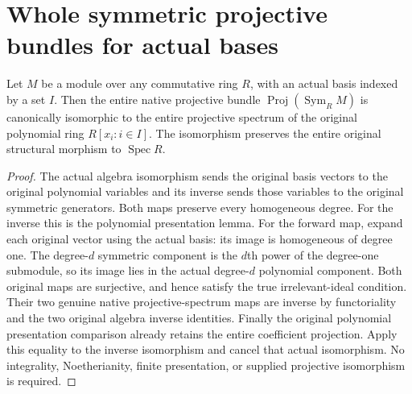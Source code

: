 \section{Whole symmetric projective bundles for actual bases}
\label{sec:symmetric-polynomial-basis-comparison}

\begin{theorem}
\label{thm:symmetric-polynomial-basis-comparison}
\leanok
{}
Let $M$ be a module over any commutative ring $R$, with an actual
basis indexed by a set $I$. Then the entire native projective bundle
$\operatorname{Proj}(\operatorname{Sym}_R M)$ is canonically isomorphic
to the entire projective spectrum of the original polynomial ring
$R[x_i:i\in I]$. The isomorphism preserves the entire original
structural morphism to $\operatorname{Spec}R$.
\end{theorem}

\begin{proof}
The actual algebra isomorphism sends the original basis vectors to
the original polynomial variables and its inverse sends those variables
to the original symmetric generators. Both maps preserve every
homogeneous degree. For the inverse this is the polynomial presentation
lemma. For the forward map, expand each original vector using the actual
basis: its image is homogeneous of degree one. The degree-$d$ symmetric
component is the $d$th power of the degree-one submodule, so its image
lies in the actual degree-$d$ polynomial component. Both original maps
are surjective, and hence satisfy the true irrelevant-ideal condition.
Their two genuine native projective-spectrum maps are inverse by
functoriality and the two original algebra inverse identities. Finally
the original polynomial presentation comparison already retains the
entire coefficient projection. Apply this equality to the inverse
isomorphism and cancel that actual isomorphism. No integrality,
Noetherianity, finite presentation, or supplied projective isomorphism
is required.
\end{proof}
